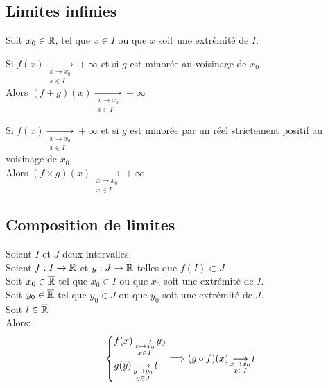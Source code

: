 \documentclass[12pt,twoside,a4paper]{article}
\begin{document}
		\subsection{Limites infinies}
			Soit $x_0\in\mathbb{R}$, tel que $x\in I$ ou que $x$ soit une extrémité de $I$.
			\begin{liste}
				\item Si $f(x)\mathop{\longrightarrow}\limits_{\substack{x\rightarrow x_0\\x\in I}}+\infty$ et si $g$ est minorée au voisinage de $x_0$,\\
					Alors $(f+g)(x)\mathop{\longrightarrow}\limits_{\substack{x\rightarrow x_0\\x\in I}}+\infty$\\
				\item Si $f(x)\mathop{\longrightarrow}\limits_{\substack{x\rightarrow x_0\\x\in I}}+\infty$ et si $g$ est minorée par un réel strictement positif au voisinage de $x_0$,\\
					Alors $(f\times g)(x)\mathop{\longrightarrow}\limits_{\substack{x\rightarrow x_0\\x\in I}}+\infty$
			\end{liste}
		\newpage
		\subsection{Composition de limites}
			Soient $I$ et $J$ deux intervalles.\\
			Soient $f:I\rightarrow \mathbb{R}$ et $g:J\rightarrow\mathbb{R}$ telles que $f(I)\subset J$\\
			Soit $x_0\in \overline{\mathbb{R}}$ tel que $x_0\in I$ ou que $x_0$ soit une extrémité de $I$.\\
			Soit $y_0\in \overline{\mathbb{R}}$ tel que $y_0\in J$ ou que $y_0$ soit une extrémité de $J$.\\
			Soit $l\in\overline{\mathbb{R}}$\\
			Alors:
			$$\left\{\begin{aligned}& f(x)\mathop{\longrightarrow}\limits_{\substack{x\rightarrow x_0\\x\in I}} y_0\\ & g(y)\mathop{\longrightarrow}\limits_{\substack{y\rightarrow y_0\\y\in J}}l\end{aligned}\right.\Longrightarrow (g\circ f)(x) \mathop{\longrightarrow}\limits_{\substack{x\rightarrow x_0\\x\in I}}l$$
\end{document}
